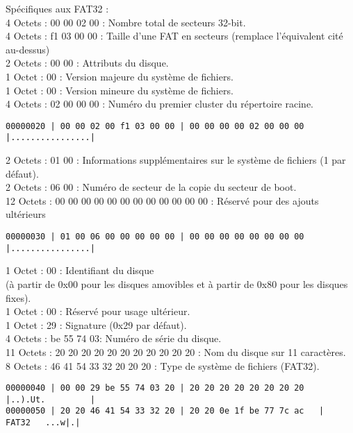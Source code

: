 \documentclass[11pt]{report}
\begin{document}
Spécifiques aux FAT32 : \\
4 Octets : 00 00 02 00 : Nombre total de secteurs 32-bit.\\
4 Octets : f1 03 00 00 : Taille d'une FAT en secteurs (remplace l'équivalent cité au-dessus)\\
2 Octets : 00 00 : Attributs du disque.\\
1 Octet : 00 : Version majeure du système de fichiers.\\
1 Octet : 00 : Version mineure du système de fichiers.\\
4 Octets : 02 00 00 00 : Numéro du premier cluster du répertoire racine.
\begin{verbatim}
00000020 | 00 00 02 00 f1 03 00 00 | 00 00 00 00 02 00 00 00   |................|
\end{verbatim}
2 Octets : 01 00 : Informations supplémentaires sur le système de fichiers (1 par défaut).\\
2 Octets : 06 00 : Numéro de secteur de la copie du secteur de boot.\\
12 Octets : 00 00 00 00 00 00 00 00 00 00 00 00 : Réservé pour des ajouts ultérieurs
\begin{verbatim}
00000030 | 01 00 06 00 00 00 00 00 | 00 00 00 00 00 00 00 00   |................|
\end{verbatim}
1 Octet : 00 : Identifiant du disque \\(à partir de 0x00 pour les disques amovibles et à partir de 0x80 pour les disques fixes).\\
1 Octet : 00 : Réservé pour usage ultérieur.\\
1 Octet : 29 : Signature (0x29 par défaut).\\
4 Octets :  be 55 74 03: Numéro de série du disque.\\
11 Octets : 20 20 20 20 20 20 20 20 20 20 20 : Nom du disque sur 11 caractères.\\
8 Octets : 46 41 54 33 32 20 20 20 : Type de système de fichiers (FAT32).
\begin{verbatim}
00000040 | 00 00 29 be 55 74 03 20 | 20 20 20 20 20 20 20 20   |..).Ut.         |
00000050 | 20 20 46 41 54 33 32 20 | 20 20 0e 1f be 77 7c ac   |  FAT32   ...w|.|
\end{verbatim}
\newpage
\end{document}
